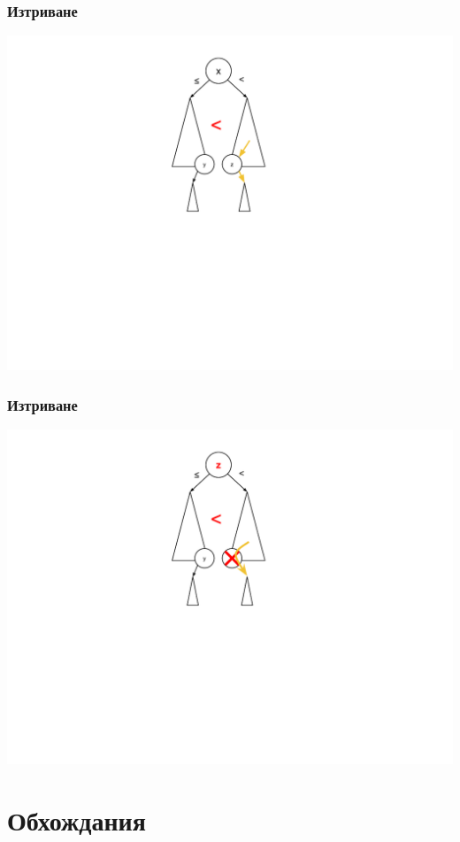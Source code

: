 \documentclass{beamer}
\begin{document}
\begin{frame}[fragile]
\frametitle{Изтриване}

\includegraphics[width=14cm]{images/tree_delete_2}

\end{frame}


\begin{frame}[fragile]
\frametitle{Изтриване}

\includegraphics[width=14cm]{images/tree_delete_3}

\end{frame}

\section{Обхождания}
\end{document}
